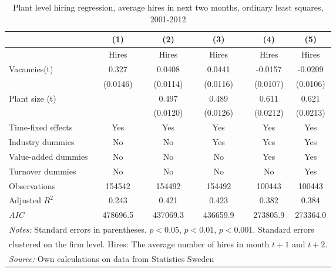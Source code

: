 \begin{table}[htbp]
\caption{\label{tab:robust_2m_avg} Plant level hiring regression, average hires in next two months, ordinary least squares,  2001-2012}
\begin{tabularx} {\textwidth} { l cXcXcXcc}
\hline
       &   (1) &&     (2) &&    (3)       &&   (4)        &   (5)      \\
\hline
        &   \footnotesize{ Hires } &&     \footnotesize{ Hires} &&    \footnotesize{ Hires }      &&  \footnotesize{ Hires }       &    \footnotesize{ Hires}     \\
\hline
Vacancies(t) &      0.327\sym{***} &&      0.0408\sym{***} &&      0.0441\sym{***} &&     -0.0157         &     -0.0209\sym{**} \\        
                    &    (0.0146)         &&    (0.0114)         &&    (0.0116)         &&    (0.0107)         &    (0.0106)         \\
Plant size (t)      &                   &&     0.497\sym{***}  &&       0.489\sym{***} &&       0.611\sym{***} &       0.621\sym{***} \\
                    &                   && (0.0120)         &&    (0.0126)         &&    (0.0212)         &    (0.0213)             \\
\hline
\footnotesize{Time-fixed effects}  & Yes                 && Yes                     &&           Yes          &&    Yes        &    Yes      \\
\footnotesize{Industry dummies}   & No                  && No                      &&     Yes                 &&    Yes        &   Yes      \\
\footnotesize{Value-added dummies} & No                  && No                      &&     No                 &&    Yes        &    Yes      \\
\footnotesize{Turnover dummies }   & No                  && No                      &&     No                 &&    No        &    Yes      \\
\hline
Observations        &   154542         &&      154492         &&      154492         &&      100443         &     100443        \\
Adjusted \(R^{2}\)  &     0.243         &&       0.421         &&       0.423         &&       0.382         &       0.384       \\
\textit{AIC}        &  478696.5         &&    437069.3         &&    436659.9         &&    273805.9         &    273364.0             \\
\hline\hline
\multicolumn{9}{l}{\footnotesize \emph{Notes:} Standard errors in parentheses. \sym{*} \(p<0.05\), \sym{**} \(p<0.01\), \sym{***} \(p<0.001\). Standard errors}\\
\multicolumn{9}{l}{\footnotesize clustered on the firm level. Hires: The average number of hires in month $t+1$ and $t+2$. }\\
\multicolumn{9}{l}{\footnotesize \emph{Source:} Own calculations on data from Statistics Sweden}\\
\end{tabularx}
\end{table}




